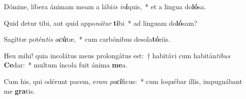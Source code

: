 \item Dómine, líbera ánimam meam a lábi\textit{is} \textit{in}\textbf{í}quis,~* et a lingua do\textbf{ló}sa.
\item Quid detur tibi, aut quid appo\textit{ná}\textit{tur} \textbf{ti}bi~* ad linguam do\textbf{ló}sam?
\item Sagíttæ potén\textit{tis} \textit{a}\textbf{cú}tæ,~* cum carbónibus desola\textbf{tó}riis.
\item Heu mihi! quia incolátus meus prolongátus est:~† habitávi cum habitán\textit{ti}\textit{bus} \textbf{Ce}dar:~* multum íncola fuit ánima \textbf{me}a.
\item Cum his, qui odérunt pacem, e\textit{ram} \textit{pa}\textbf{cí}ficus:~* cum loquébar illis, impugnábant me \textbf{gra}tis.
